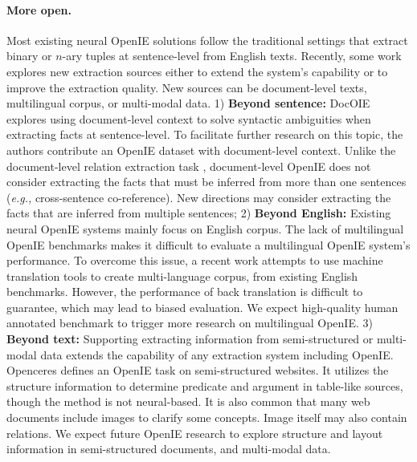 \documentclass{article}
\newcommand{\eg}{\emph{e.g.,}\xspace}
\begin{document}
\paragraph{More open.} Most existing neural OpenIE solutions follow the traditional settings that extract binary or $n$-ary tuples at sentence-level from English texts. Recently, some work explores new extraction sources either to extend the system's capability or to improve the extraction quality. New sources can be document-level texts, multilingual corpus, or multi-modal data. 
1) \textbf{Beyond sentence:} DocOIE \cite{dong-etal-2021-docoie} explores using document-level context to solve syntactic ambiguities when extracting facts at sentence-level. To facilitate further research on this topic, the authors contribute an OpenIE dataset with document-level context. Unlike the document-level relation extraction task \cite{yao-etal-2019-docred}, document-level OpenIE does not consider extracting the facts that must be inferred from more than one sentences (\eg cross-sentence co-reference). New directions may consider extracting the facts that are inferred from multiple sentences;
2) \textbf{Beyond English:} Existing neural OpenIE systems mainly focus on English corpus. The lack of multilingual OpenIE benchmarks makes it difficult to evaluate a multilingual OpenIE system's performance. To overcome this issue, a recent work \cite{ro-etal-2020-multi} attempts to use machine translation tools to create multi-language corpus, from existing English benchmarks. 
However, the performance of back translation is difficult to guarantee, which may lead to biased evaluation.
We expect high-quality human annotated benchmark to trigger more research on multilingual OpenIE.
3) \textbf{Beyond text:} Supporting extracting information from semi-structured or multi-modal data extends the capability of any extraction system including OpenIE. Openceres \cite{lockard-etal-2019-openceres} defines an OpenIE task on semi-structured websites. It utilizes the structure information to determine predicate and argument in table-like sources, though the method is not neural-based. It is also common that many web documents include images to clarify some concepts. Image itself may also contain relations. We expect future OpenIE research to explore structure and layout information in semi-structured documents, and multi-modal data.
\end{document}
